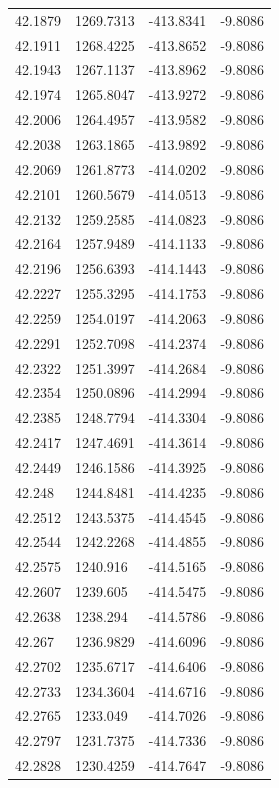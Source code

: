 \begin{table}[H]
\begin{tabular}{llll}
42.1879 & 1269.7313 & -413.8341 & -9.8086 \\
42.1911 & 1268.4225 & -413.8652 & -9.8086 \\
42.1943 & 1267.1137 & -413.8962 & -9.8086 \\
42.1974 & 1265.8047 & -413.9272 & -9.8086 \\
42.2006 & 1264.4957 & -413.9582 & -9.8086 \\
42.2038 & 1263.1865 & -413.9892 & -9.8086 \\
42.2069 & 1261.8773 & -414.0202 & -9.8086 \\
42.2101 & 1260.5679 & -414.0513 & -9.8086 \\
42.2132 & 1259.2585 & -414.0823 & -9.8086 \\
42.2164 & 1257.9489 & -414.1133 & -9.8086 \\
42.2196 & 1256.6393 & -414.1443 & -9.8086 \\
42.2227 & 1255.3295 & -414.1753 & -9.8086 \\
42.2259 & 1254.0197 & -414.2063 & -9.8086 \\
42.2291 & 1252.7098 & -414.2374 & -9.8086 \\
42.2322 & 1251.3997 & -414.2684 & -9.8086 \\
42.2354 & 1250.0896 & -414.2994 & -9.8086 \\
42.2385 & 1248.7794 & -414.3304 & -9.8086 \\
42.2417 & 1247.4691 & -414.3614 & -9.8086 \\
42.2449 & 1246.1586 & -414.3925 & -9.8086 \\
42.248 & 1244.8481 & -414.4235 & -9.8086 \\
42.2512 & 1243.5375 & -414.4545 & -9.8086 \\
42.2544 & 1242.2268 & -414.4855 & -9.8086 \\
42.2575 & 1240.916 & -414.5165 & -9.8086 \\
42.2607 & 1239.605 & -414.5475 & -9.8086 \\
42.2638 & 1238.294 & -414.5786 & -9.8086 \\
42.267 & 1236.9829 & -414.6096 & -9.8086 \\
42.2702 & 1235.6717 & -414.6406 & -9.8086 \\
42.2733 & 1234.3604 & -414.6716 & -9.8086 \\
42.2765 & 1233.049 & -414.7026 & -9.8086 \\
42.2797 & 1231.7375 & -414.7336 & -9.8086 \\
42.2828 & 1230.4259 & -414.7647 & -9.8086 \\

\end{tabular}
\end{table}
